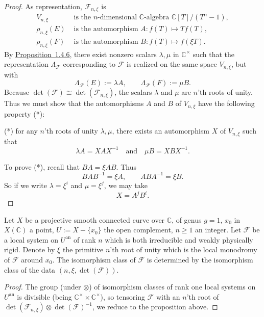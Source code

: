 \begin{proof}
As representation, \(\mathcal{F}_{n,\xi}\) is
\[
  \begin{aligned}
  V_{n,\xi}&\text{ is the }n\text{-dimensional }\mathbb{C}\text{-algebra }
  \mathbb{C}[T]/(T^n-1),\\
  \rho_{n,\xi}(E)&\text{ is the automorphism }A:f(T)\mapsto Tf(T),\\
  \rho_{n,\xi}(F)&\text{ is the automorphism }B:f(T)\mapsto f(\xi T).
  \end{aligned}
\]
By \hyperref[prop:1.4.6]{Proposition~1.4.6}, there exist nonzero scalars
\(\lambda,\mu\) in \(\mathbb{C}^{\times}\)
such that the representation \(\Lambda_{\mathcal{F}}\) corresponding to
\(\mathcal{F}\) is realized on the same space \(V_{n,\xi}\), but with
\[
  \Lambda_{\mathcal{F}}(E):=\lambda A,\qquad
  \Lambda_{\mathcal{F}}(F):=\mu B.
\]
Because \(\det(\mathcal{F})\cong\det(\mathcal{F}_{n,\xi})\), the scalars
\(\lambda\) and \(\mu\) are \(n\)'th roots of unity. Thus we must show that the
automorphisms \(A\) and \(B\) of \(V_{n,\xi}\) have the following property (*):

\par\addvspace{\sourceblockpreskip}%
\noindent(*) for any \(n\)'th roots of unity \(\lambda,\mu\), there exists an
automorphism \(X\) of \(V_{n,\xi}\) such that
\[
  \lambda A=XAX^{-1}\quad\text{and}\quad \mu B=XBX^{-1}.
\]

To prove (*), recall that \(BA=\xi AB\). Thus
\[
  BAB^{-1}=\xi A,\qquad ABA^{-1}=\xi B.
\]
So if we write \(\lambda=\xi^i\) and \(\mu=\xi^j\), we may take
\[
  X=A^jB^i.
\]
\end{proof}

\setcounter{theorem}{9}
\begin{corollary}
\label{cor:1.4.10}
Let \(X\) be a projective smooth connected curve over \(\mathbb{C}\), of genus
\(g=1\), \(x_0\) in \(X(\mathbb{C})\) a point, \(U:=X-\{x_0\}\) the open
complement, \(n\geq 1\) an integer. Let \(\mathcal{F}\) be a local system on
\(U^{\mathrm{an}}\) of rank \(n\) which is both irreducible and weakly
physically rigid. Denote by \(\xi\) the primitive \(n\)'th root of unity which
is the local monodromy of \(\mathcal{F}\) around \(x_0\). The isomorphism class
of \(\mathcal{F}\) is determined by the isomorphism class of the data
\((n,\xi,\det(\mathcal{F}))\).
\end{corollary}

\begin{proof}
The group (under \(\otimes\)) of isomorphism classes of rank one local systems
on \(U^{\mathrm{an}}\) is divisible (being \(\mathbb{C}^{\times}\times
\mathbb{C}^{\times}\)), so tensoring \(\mathcal{F}\) with an \(n\)'th root of
\(\det(\mathcal{F}_{n,\xi})\otimes\det(\mathcal{F})^{-1}\), we reduce to the
proposition above.
\end{proof}

